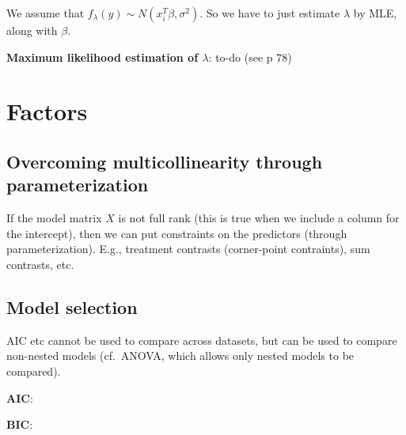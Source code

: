 We assume that $f_\lambda (y) \sim N(x_i^T \beta,\sigma^2)$. So we have to just estimate $\lambda$ by MLE, along with $\beta$.

\textbf{Maximum likelihood estimation of $\lambda$}: to-do (see p 78)

\section{Factors}
\subsection{Overcoming multicollinearity through parameterization}

If the model matrix $X$ is not full rank (this is true when we include a column for the intercept), then we can put constraints on the predictors (through parameterization). E.g., treatment contrasts (corner-point contraints), sum contrasts, etc.



\subsection{Model selection}

AIC etc cannot be used to compare across datasets, but can be used to compare non-nested models (cf.\ ANOVA, which allows only nested models to be compared).

\textbf{AIC}:

\textbf{BIC}:






